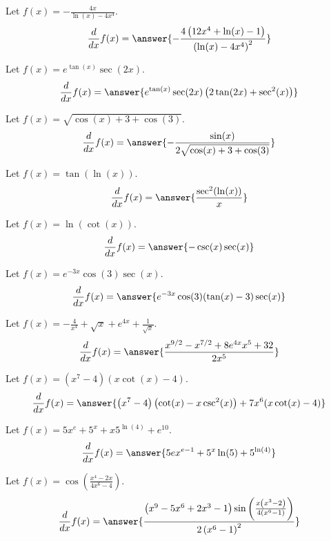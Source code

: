 \documentclass{ximera}
\begin{document}
\begin{shuffle}
\begin{exercise}
Let $f(x)=-\frac{4 x}{\ln (x)-4 x^4}$.
\[
\ddx f(x) = \answer{-\frac{4 \left(12 x^4+\ln (x)-1\right)}{\left(\ln (x)-4 x^4\right)^2}}
\]
\end{exercise}

\begin{exercise}
Let $f(x)=e^{\tan (x)} \sec (2 x)$.
\[
\ddx f(x) = \answer{e^{\tan (x)} \sec (2 x) \left(2 \tan (2 x)+\sec ^2(x)\right)}
\]
\end{exercise}

\begin{exercise}
Let $f(x)=\sqrt{\cos (x)+3+\cos (3)}$.
\[
\ddx f(x) = \answer{-\frac{\sin (x)}{2 \sqrt{\cos (x)+3+\cos (3)}}}
\]
\end{exercise}

\begin{exercise}
Let $f(x)=\tan (\ln (x))$.
\[
\ddx f(x) = \answer{\frac{\sec ^2(\ln (x))}{x}}
\]
\end{exercise}

\begin{exercise}
Let $f(x)=\ln (\cot (x))$.
\[
\ddx f(x) = \answer{-\csc (x) \sec (x)}
\]
\end{exercise}

\begin{exercise}
Let $f(x)=e^{-3 x} \cos (3) \sec (x)$.
\[
\ddx f(x) = \answer{e^{-3 x} \cos (3) (\tan (x)-3) \sec (x)}
\]
\end{exercise}

\begin{exercise}
Let $f(x)=-\frac{4}{x^4}+\sqrt{x}+e^{4 x}+\frac{1}{\sqrt{x}}$.
\[
\ddx f(x) = \answer{\frac{x^{9/2}-x^{7/2}+8 e^{4 x} x^5+32}{2 x^5}}
\]
\end{exercise}

\begin{exercise}
Let $f(x)=\left(x^7-4\right) (x \cot (x)-4)$.
\[
\ddx f(x) = \answer{\left(x^7-4\right) \left(\cot (x)-x \csc ^2(x)\right)+7 x^6 (x \cot (x)-4)}
\]
\end{exercise}

\begin{exercise}
Let $f(x)=5 x^e+5^x+x 5^{\ln (4)}+e^{10}$.
\[
\ddx f(x) = \answer{5 e x^{e-1}+5^x \ln (5)+5^{\ln (4)}}
\]
\end{exercise}

\begin{exercise}
Let $f(x)=\cos \left(\frac{x^4-2 x}{4 x^6-4}\right)$.
\[
\ddx f(x) = \answer{\frac{\left(x^9-5 x^6+2 x^3-1\right) \sin \left(\frac{x \left(x^3-2\right)}{4 \left(x^6-1\right)}\right)}{2 \left(x^6-1\right)^2}}
\]
\end{exercise}


\end{shuffle}
\end{document}
